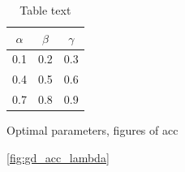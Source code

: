 \begin{table}[H]
\caption{Table text}
\centering
{}
\begin{tabular}{ccc}
\hline
\hline 
$\alpha$ & $\beta$ & $\gamma$
\\
\hline 
\hline 
0.1 & 0.2 & 0.3
\\
0.4 & 0.5 & 0.6
\\
0.7 & 0.8 & 0.9
\\
\hline
\end{tabular}
\label{tab:tab1}
\end{table}


Optimal parameters, figures of acc 

\autoref{fig:gd_acc_lambda}

\begin{figure}[H]
\centering
{}
\qquad
{}

\end{figure}
